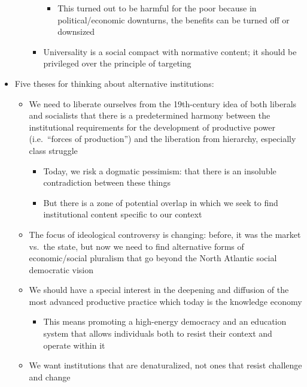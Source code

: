 \begin{itemize}
\begin{itemize}
\begin{itemize}
      \begin{itemize}
      \tightlist
      \item
        This turned out to be harmful for the poor because in
        political/economic downturns, the benefits can be turned off or
        downsized
      \end{itemize}
    \item
      Universality is a social compact with normative content; it should
      be privileged over the principle of targeting
    \end{itemize}
  \end{itemize}
\item
  Five theses for thinking about alternative institutions:

  \begin{itemize}
  \tightlist
  \item
    We need to liberate ourselves from the 19th-century idea of both
    liberals and socialists that there is a predetermined harmony
    between the institutional requirements for the development of
    productive power (i.e.~``forces of production'') and the liberation
    from hierarchy, especially class struggle

    \begin{itemize}
    \tightlist
    \item
      Today, we risk a dogmatic pessimism: that there is an insoluble
      contradiction between these things
    \item
      But there is a zone of potential overlap in which we seek to find
      institutional content specific to our context
    \end{itemize}
  \item
    The focus of ideological controversy is changing: before, it was the
    market vs.~the state, but now we need to find alternative forms of
    economic/social pluralism that go beyond the North Atlantic social
    democratic vision
  \item
    We should have a special interest in the deepening and diffusion of
    the most advanced productive practice which today is the knowledge
    economy

    \begin{itemize}
    \tightlist
    \item
      This means promoting a high-energy democracy and an education
      system that allows individuals both to resist their context and
      operate within it
    \end{itemize}
  \item
    We want institutions that are denaturalized, not ones that resist
    challenge and change


\end{itemize}
\end{itemize}
